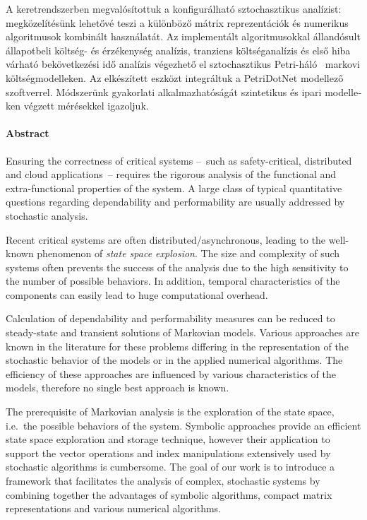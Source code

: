 \begin{otherlanguage}{magyar}
  A keretrendszerben megvalósítottuk a konfigurálható sztochasztikus
  analízist: megközelítésünk lehetővé teszi a különböző
  mátrix reprezentációk és numerikus algoritmusok kombinált
  használatát. Az implementált algoritmusokkal állandósult állapotbeli
  költség- és érzékenység analízis, tranziens költséganalízis és első
  hiba várható bekövetkezési idő analízis végezhető el sztochasztikus
  Petri-háló~ markovi költségmodelleken. Az
  elkészített eszközt integráltuk a PetriDotNet modellező
  szoftverrel. Módszerünk gyakorlati alkalmazhatóságát szintetikus és
  ipari modelleken végzett mérésekkel igazoljuk.

\end{otherlanguage}

\cleardoublepage

\paragraph*{Abstract}
{}
\thispagestyle{plain}

Ensuring the correctness of critical systems --~such as
safety-critical, distributed and cloud applications~-- requires the
rigorous analysis of the functional and extra-functional properties of
the system. A large class of typical quantitative questions regarding
dependability and performability are usually addressed by stochastic
analysis.

Recent critical systems are often distributed/asynchronous, leading to
the well-known phenomenon of \emph{state space explosion}. The size
and complexity of such systems often prevents the success of the
analysis due to the high sensitivity to the number of possible
behaviors. In addition, temporal characteristics of the components can
easily lead to huge computational overhead.

Calculation of dependability and performability measures can be
reduced to steady-state and transient solutions of Markovian
models. Various approaches are known in the literature for these
problems differing in the representation of the stochastic behavior of
the models or in the applied numerical algorithms. The efficiency of
these approaches are influenced by various characteristics of the
models, therefore no single best approach is known.

The prerequisite of Markovian analysis is the exploration of the state
space, i.e.~the possible behaviors of the system. Symbolic approaches
provide an efficient state space exploration and storage technique,
however their application to support the vector operations and index
manipulations extensively used by stochastic algorithms is cumbersome.
The goal of our work is to introduce a framework that facilitates the
analysis of complex, stochastic systems by combining together the
advantages of symbolic algorithms, compact matrix representations and
various numerical algorithms.

